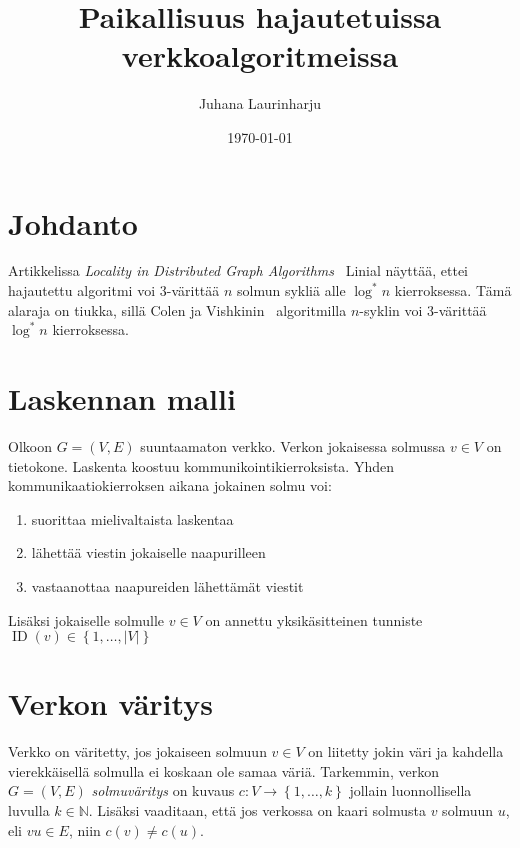 \documentclass[finnish]{tktltiki2}
\title{Paikallisuus hajautetuissa verkkoalgoritmeissa}
\author{Juhana Laurinharju}
\date{\today}
\theoremstyle{definition}
\theoremstyle{remark}
\newcommand{\set}[1]{\left\{ #1 \right\}}
\newcommand{\nat}{\mathbb{N}}
\DeclareMathOperator{\id}{ID}
\begin{document}

\maketitle        %

\newpage          %



\section*{Johdanto}

Artikkelissa \emph{Locality in Distributed Graph Algorithms}~\cite{linial92}
Linial näyttää, ettei hajautettu algoritmi voi 3-värittää $n$ solmun sykliä
alle ${\log^* n}$ kierroksessa. Tämä alaraja on tiukka, sillä Colen ja
Vishkinin~\cite{colevishkin86} algoritmilla $n$-syklin voi 3-värittää ${\log^*
n}$ kierroksessa.

\section*{Laskennan malli}

Olkoon $G = (V,E)$ suuntaamaton verkko. Verkon jokaisessa solmussa $v \in V$ on
tietokone. Laskenta koostuu kommunikointikierroksista. Yhden
kommunikaatiokierroksen aikana jokainen solmu voi:

\begin{enumerate}
    \item suorittaa mielivaltaista laskentaa
    \item lähettää viestin jokaiselle naapurilleen
    \item vastaanottaa naapureiden lähettämät viestit
\end{enumerate}

Lisäksi jokaiselle solmulle $v \in V$ on annettu yksikäsitteinen tunniste
$\id(v) \in \set{1,\dots,|V|}$

\section*{Verkon väritys}

Verkko on väritetty, jos jokaiseen solmuun $v \in V$ on liitetty jokin väri ja
kahdella vierekkäisellä solmulla ei koskaan ole samaa väriä. Tarkemmin, verkon
$G = (V,E)$ \emph{solmuväritys} on kuvaus $c : V \rightarrow \set{1,\dots,k}$
jollain luonnollisella luvulla $k \in \nat$. Lisäksi vaaditaan, että jos
verkossa on kaari solmusta $v$ solmuun $u$, eli $vu \in E$, niin $c(v) \neq
c(u)$.
\end{document}
